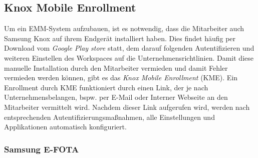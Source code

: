 \subsection{Knox Mobile Enrollment}
Um ein EMM-System aufzubauen, ist es notwendig, dass die Mitarbeiter auch Samsung Knox auf ihrem Endgerät installiert haben. Dies findet häufig per Download vom \textit{Google Play store} statt, dem darauf folgenden Autentifizieren und weiteren Einstellen des Workspaces auf die Unternehmensrichtlinien. 
Damit diese manuelle Installation durch den Mitarbeiter vermieden und damit Fehler vermieden werden können, gibt es das \textit{Knox Mobile Enrollment} (KME). Ein Enrollment durch KME funktioniert durch einen Link, der je nach Unternehmensbelangen, bspw. per E-Mail oder Interner Webseite an den Mitarbeiter vermittelt wird. Nachdem dieser Link aufgerufen wird, werden nach entsprechenden Autentifizierungsmaßnahmen, alle Einstellungen und Applikationen automatisch konfiguriert.
\subsubsection{Samsung E-FOTA}






















